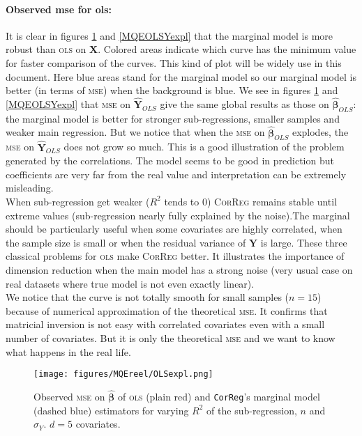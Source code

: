 \documentclass[12pt,a4paper]{report}
\begin{document}
		\paragraph{Observed {\sc mse} for {\sc ols}:} It is clear in figures \ref{MSEOLSexpl} and \ref{MQEOLSYexpl} that the marginal model is more robust than \textsc{ols} on $\boldsymbol{X}$. Colored areas indicate which curve has the minimum value for faster comparison of the curves. This kind of plot will be widely use in this document. Here blue areas stand for the marginal model so our marginal model is better (in terms of \textsc{mse}) when the background is blue.
	We see in figures \ref{MSEOLSexpl} and \ref{MQEOLSYexpl} that \textsc{mse} on $\hat{\boldsymbol{Y}}_{OLS}$ give the same global results as those on $\hat{\boldsymbol{\beta}}_{OLS}$: the marginal model is better for stronger sub-regressions, smaller samples and weaker main regression. But we notice that when the \textsc{mse} on $\hat{\boldsymbol{\beta}}_{OLS}$ explodes, the \textsc{mse} on $\hat{\boldsymbol{Y}}_{OLS}$ does not grow so much. This is a good illustration of the problem generated by the correlations. The model seems to be good in prediction but coefficients are very far from the real value and interpretation can be extremely misleading.\\
	
When sub-regression get weaker ($R^2$ tends to 0) \textsc{CorReg} remains stable until extreme values (sub-regression nearly fully explained by the noise).The marginal should be particularly useful when some covariates are highly correlated, when the sample size is small or when the residual variance of $\boldsymbol{Y}$ is large. These three classical problems for \textsc{ols} make \textsc{CorReg} better. It illustrates the importance of dimension reduction when the main model has a strong noise (very usual case on real datasets where true model is not even exactly linear). \\
	
	We notice that the curve is not totally smooth for small samples ($n=15$) because of numerical approximation of the theoretical \textsc{mse}. It confirms that matricial inversion is not easy with correlated covariates even with a small number of covariates. But it is only the theoretical \textsc{mse} and we want to know what happens in the real life. \\
	
 \begin{figure}[h!]
	\texttt{[image: figures/MQEreel/OLSexpl.png]}
	\caption{Observed \textsc{mse} on $\hat{\boldsymbol{\beta}}$ of \textsc{ols} (plain red) and {\tt CorReg}'s marginal model (dashed blue) estimators for varying $R^2$ of the sub-regression, $n$ and $\sigma_Y$. $d=5$ covariates.}\label{MSEOLSexpl}
\end{figure} 
	
\end{document}
